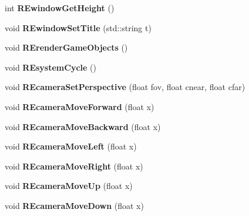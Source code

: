 \begin{DoxyCompactItemize}
\item 
\hypertarget{class_i_s_e_adb3302c6bfad978aa8dbe5c03ccf3280}{int {\bfseries R\-Ewindow\-Get\-Height} ()}\label{class_i_s_e_adb3302c6bfad978aa8dbe5c03ccf3280}

\item 
\hypertarget{class_i_s_e_a9de85a7b59329612bd8533c1976be1e6}{void {\bfseries R\-Ewindow\-Set\-Title} (std\-::string t)}\label{class_i_s_e_a9de85a7b59329612bd8533c1976be1e6}

\item 
\hypertarget{class_i_s_e_a50d1bef6e0184967784e1e854c69abe6}{void {\bfseries R\-Erender\-Game\-Objects} ()}\label{class_i_s_e_a50d1bef6e0184967784e1e854c69abe6}

\item 
\hypertarget{class_i_s_e_a1860069b186938d3075caad0d9049e2b}{void {\bfseries R\-Esystem\-Cycle} ()}\label{class_i_s_e_a1860069b186938d3075caad0d9049e2b}

\item 
\hypertarget{class_i_s_e_a48d5364292ea4e39c0b49f25c0ee6338}{void {\bfseries R\-Ecamera\-Set\-Perspective} (float fov, float cnear, float cfar)}\label{class_i_s_e_a48d5364292ea4e39c0b49f25c0ee6338}

\item 
\hypertarget{class_i_s_e_a4dc3bb36f0e4ce0e317838b9104f51b9}{void {\bfseries R\-Ecamera\-Move\-Forward} (float x)}\label{class_i_s_e_a4dc3bb36f0e4ce0e317838b9104f51b9}

\item 
\hypertarget{class_i_s_e_a78c36080045f23df6aa612bf56166c51}{void {\bfseries R\-Ecamera\-Move\-Backward} (float x)}\label{class_i_s_e_a78c36080045f23df6aa612bf56166c51}

\item 
\hypertarget{class_i_s_e_adbad68f681d707bab79722714d259c8b}{void {\bfseries R\-Ecamera\-Move\-Left} (float x)}\label{class_i_s_e_adbad68f681d707bab79722714d259c8b}

\item 
\hypertarget{class_i_s_e_a7c8671deaa658b729581366dd8c6e52e}{void {\bfseries R\-Ecamera\-Move\-Right} (float x)}\label{class_i_s_e_a7c8671deaa658b729581366dd8c6e52e}

\item 
\hypertarget{class_i_s_e_a569076f9c5287ca8be6643d2ca88570c}{void {\bfseries R\-Ecamera\-Move\-Up} (float x)}\label{class_i_s_e_a569076f9c5287ca8be6643d2ca88570c}

\item 
\hypertarget{class_i_s_e_a2a7a08c1bfd2bec4f9c6f36c2e8525cf}{void {\bfseries R\-Ecamera\-Move\-Down} (float x)}\label{class_i_s_e_a2a7a08c1bfd2bec4f9c6f36c2e8525cf}


\end{DoxyCompactItemize}
